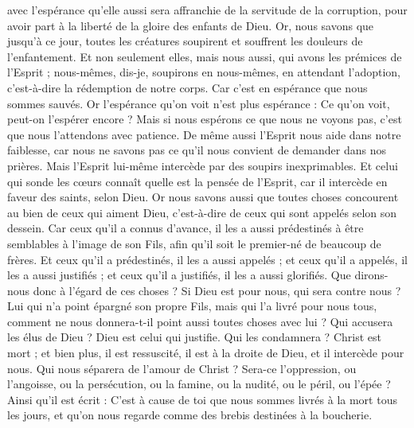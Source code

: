 \begin{multicols}{2}
avec l’espérance qu’elle aussi sera affranchie de la servitude de la corruption, pour avoir part à la liberté de la gloire des enfants de Dieu.
Or, nous savons que jusqu’à ce jour, toutes les créatures soupirent et souffrent les douleurs de l’enfantement.
Et non seulement elles, mais nous aussi, qui avons les prémices de l'Esprit ; nous-mêmes, dis-je, soupirons en nous-mêmes, en attendant l'adoption, c'est-à-dire la rédemption de notre corps.
Car c’est en espérance que nous sommes sauvés. Or l’espérance qu’on voit n’est plus espérance : Ce qu’on voit, peut-on l’espérer encore ?
Mais si nous espérons ce que nous ne voyons pas, c'est que nous l'attendons avec patience.
De même aussi l’Esprit nous aide dans notre faiblesse, car nous ne savons pas ce qu’il nous convient de demander dans nos prières. Mais l’Esprit lui-même intercède par des soupirs inexprimables.
Et celui qui sonde les cœurs connaît quelle est la pensée de l'Esprit, car il intercède en faveur des saints, selon Dieu.
Or nous savons aussi que toutes choses concourent au bien de ceux qui aiment Dieu, c'est-à-dire de ceux qui sont appelés selon son dessein.
Car ceux qu'il a connus d’avance, il les a aussi prédestinés à être semblables à l'image de son Fils, afin qu'il soit le premier-né de beaucoup de frères.
Et ceux qu'il a prédestinés, il les a aussi appelés ; et ceux qu'il a appelés, il les a aussi justifiés ; et ceux qu'il a justifiés, il les a aussi glorifiés.
Que dirons-nous donc à l’égard de ces choses ? Si Dieu est pour nous, qui sera contre nous ?
Lui qui n'a point épargné son propre Fils, mais qui l'a livré pour nous tous, comment ne nous donnera-t-il point aussi toutes choses avec lui ?
Qui accusera les élus de Dieu ? Dieu est celui qui justifie.
Qui les condamnera ? Christ est mort ; et bien plus, il est ressuscité, il est à la droite de Dieu, et il intercède pour nous.
Qui nous séparera de l'amour de Christ ? Sera-ce l'oppression, ou l'angoisse, ou la persécution, ou la famine, ou la nudité, ou le péril, ou l'épée ?
Ainsi qu'il est écrit : C’est à cause de toi que nous sommes livrés à la mort tous les jours, et qu’on nous regarde comme des brebis destinées à la boucherie.

\end{multicols}
